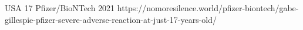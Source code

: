           {USA}
          {17}
          {Pfizer/BioNTech}
          {2021}
          {}
          {https://nomoresilence.world/pfizer-biontech/gabe-gillespie-pfizer-severe-adverse-reaction-at-just-17-years-old/}

